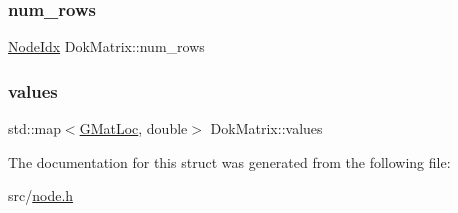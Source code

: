 \mbox{\label{structDokMatrix_a653139601f15712d7fea0179d19824a1}} 
\subsubsection{\texorpdfstring{num\+\_\+rows}{num\_rows}}
{\footnotesize\ttfamily \hyperlink{node_8h_a5b622fe4354316a2f349615d150ae998}{Node\+Idx} Dok\+Matrix\+::num\+\_\+rows}

\mbox{\label{structDokMatrix_a1474a0133b470ffb7058cc88962046e6}} 
\subsubsection{\texorpdfstring{values}{values}}
{\footnotesize\ttfamily std\+::map$<$\hyperlink{node_8h_aaffe095b1e5d88040e6ca3976576fccf}{G\+Mat\+Loc}, double$>$ Dok\+Matrix\+::values}



The documentation for this struct was generated from the following file\+:\begin{DoxyCompactItemize}
\item 
src/\hyperlink{node_8h}{node.\+h}\end{DoxyCompactItemize}
